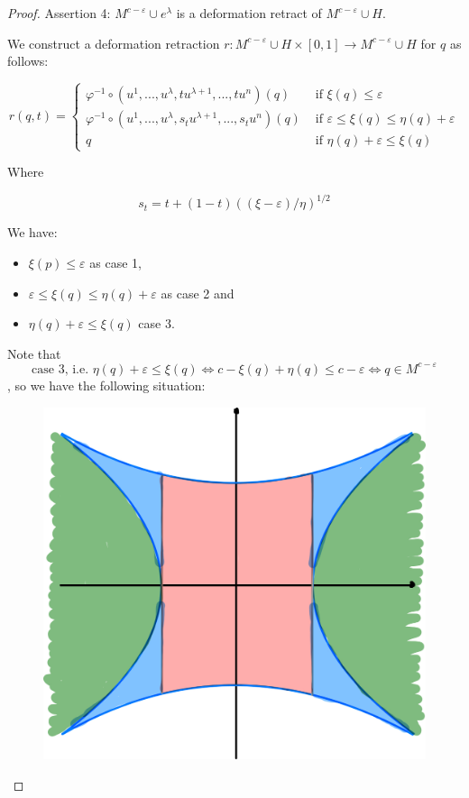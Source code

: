 \begin{proof}
   Assertion 4: $M^{c - \varepsilon} \cup e^{\lambda}$  is a deformation 
   retract of $M^{c - \varepsilon} \cup H$.

   We construct a deformation retraction 
   $r: M^{c - \varepsilon} \cup H \times [0, 1] \rightarrow M^{c - \varepsilon} \cup H$ 
   for $q$ as follows:

   \[ 
      r(q, t) = \begin{cases}
         \varphi^{-1} \circ (u^1, ..., u^{\lambda}, tu^{\lambda + 1}, ..., tu^n) (q) 
               & \text{ if } \xi(q) \leq \varepsilon \\
         \varphi^{-1} \circ (u^1, ..., u^{\lambda}, s_tu^{\lambda + 1}, ..., s_tu^n) (q) 
               & \text { if } \varepsilon \leq \xi(q) \leq \eta(q) + \varepsilon \\
         q & \text{ if } \eta(q) + \varepsilon \leq \xi(q)
      \end{cases}
   \]

   Where 

   \[ s_t = t + (1 - t)((\xi - \varepsilon)/\eta)^{1/2} \]

   We have:
   
   \begin{itemize}
      \item[] $\xi(p) \leq \varepsilon$ as case 1,
      \item[] $\varepsilon \leq \xi(q) \leq \eta(q) + \varepsilon$ as case 2 and
      \item[] $\eta(q) + \varepsilon \leq \xi(q)$ case 3.
   \end{itemize}
   
   Note that 
   \[ \text{case 3, i.e. } \eta(q) + \varepsilon \leq \xi(q)
   \Leftrightarrow c - \xi(q) + \eta(q) \leq c - \varepsilon 
   \Leftrightarrow q \in M^{c - \varepsilon}\]
   , so we have the following situation:

   \begin{figure}[H]
      \centering
      \includegraphics[width=0.6\linewidth]{./resources/Me-Diagram1.jpeg}
   \end{figure}


\end{proof}

